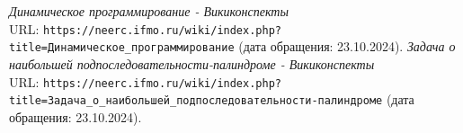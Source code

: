  
\begin{thebibliography}{99}
	
	{\itshape Динамическое программирование - Викиконспекты} \\URL: \texttt{https://neerc.ifmo.ru/wiki/index.php?title=Динамическое\_программирование} (дата обращения: 23.10.2024).
	{\itshape Задача о наибольшей подпоследовательности-палиндроме - Викиконспекты} \\URL: \texttt{https://neerc.ifmo.ru/wiki/index.php?title=Задача\_о\_наибольшей\_подпоследовательности-палиндроме} (дата обращения: 23.10.2024).
	
\end{thebibliography}
\pagebreak